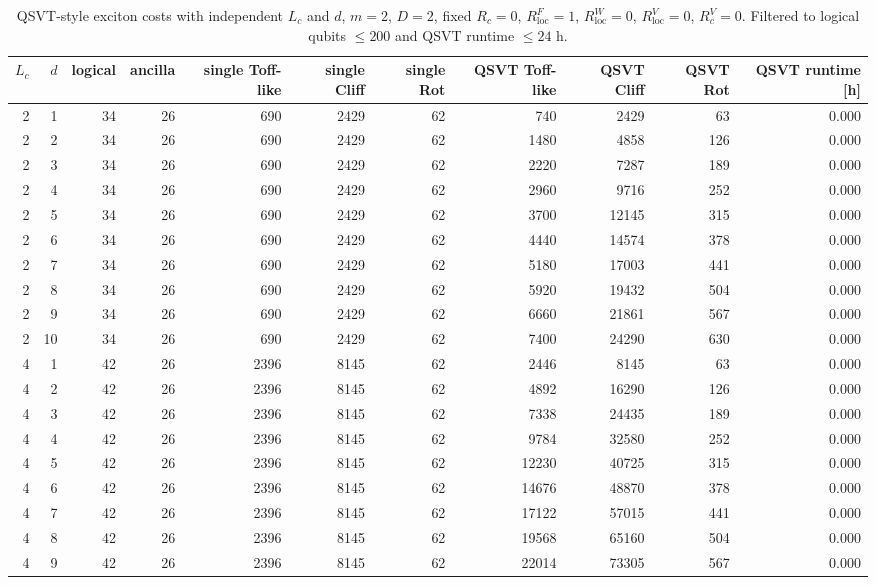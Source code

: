 \begin{table}[t]
\centering
\scriptsize
\caption{QSVT-style exciton costs with independent $L_c$ and $d$, $m=2$, $D=2$, fixed $R_c=0$, $R_{\mathrm{loc}}^F=1$, $R_{\mathrm{loc}}^W=0$, $R_{\mathrm{loc}}^V=0$, $R_c^V=0$. Filtered to logical qubits $\leq 200$ and QSVT runtime $\leq 24$ h.}
\begin{tabularx}{\linewidth}{rrrrrrrrrrr}
\toprule
$L_c$ & $d$ & logical & ancilla & single Toff-like & single Cliff & single Rot & QSVT Toff-like & QSVT Cliff & QSVT Rot & QSVT runtime [h] \\
\midrule
2 & 1 & 34 & 26 & 690 & 2429 & 62 & 740 & 2429 & 63 & 0.000 \\
2 & 2 & 34 & 26 & 690 & 2429 & 62 & 1480 & 4858 & 126 & 0.000 \\
2 & 3 & 34 & 26 & 690 & 2429 & 62 & 2220 & 7287 & 189 & 0.000 \\
2 & 4 & 34 & 26 & 690 & 2429 & 62 & 2960 & 9716 & 252 & 0.000 \\
2 & 5 & 34 & 26 & 690 & 2429 & 62 & 3700 & 12145 & 315 & 0.000 \\
2 & 6 & 34 & 26 & 690 & 2429 & 62 & 4440 & 14574 & 378 & 0.000 \\
2 & 7 & 34 & 26 & 690 & 2429 & 62 & 5180 & 17003 & 441 & 0.000 \\
2 & 8 & 34 & 26 & 690 & 2429 & 62 & 5920 & 19432 & 504 & 0.000 \\
2 & 9 & 34 & 26 & 690 & 2429 & 62 & 6660 & 21861 & 567 & 0.000 \\
2 & 10 & 34 & 26 & 690 & 2429 & 62 & 7400 & 24290 & 630 & 0.000 \\
4 & 1 & 42 & 26 & 2396 & 8145 & 62 & 2446 & 8145 & 63 & 0.000 \\
4 & 2 & 42 & 26 & 2396 & 8145 & 62 & 4892 & 16290 & 126 & 0.000 \\
4 & 3 & 42 & 26 & 2396 & 8145 & 62 & 7338 & 24435 & 189 & 0.000 \\
4 & 4 & 42 & 26 & 2396 & 8145 & 62 & 9784 & 32580 & 252 & 0.000 \\
4 & 5 & 42 & 26 & 2396 & 8145 & 62 & 12230 & 40725 & 315 & 0.000 \\
4 & 6 & 42 & 26 & 2396 & 8145 & 62 & 14676 & 48870 & 378 & 0.000 \\
4 & 7 & 42 & 26 & 2396 & 8145 & 62 & 17122 & 57015 & 441 & 0.000 \\
4 & 8 & 42 & 26 & 2396 & 8145 & 62 & 19568 & 65160 & 504 & 0.000 \\
4 & 9 & 42 & 26 & 2396 & 8145 & 62 & 22014 & 73305 & 567 & 0.000 \\

\end{tabularx}
\end{table}
